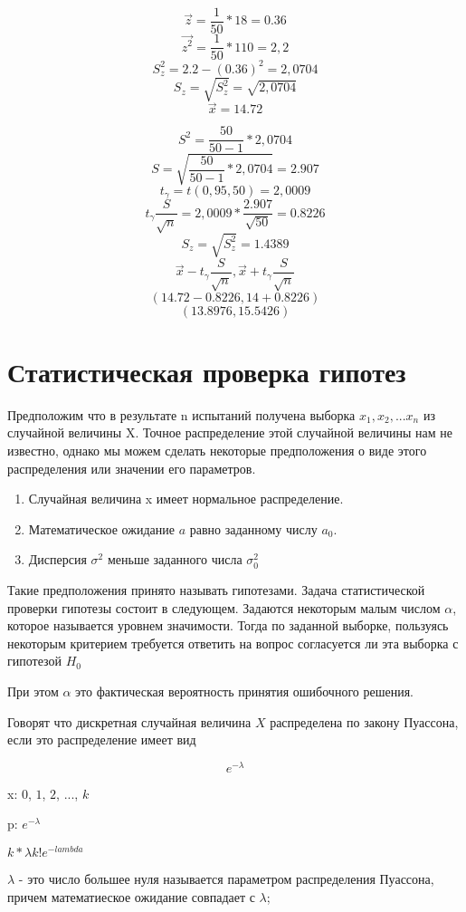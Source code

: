 \documentclass[a4paper]{article}
\begin{document}
$$ \vec{z} = \frac{1}{50} * 18 = 0.36$$
$$ \vec{z^2} = \frac{1}{50} * 110 = 2,2$$
$$ S_{z}^2 = 2.2 - (0.36)^2 = 2,0704 $$
$$ S_{z} = \sqrt{S_{z}^2} = \sqrt{2,0704} $$
$$ \vec{x} = 14.72$$

$$ S^2 = \frac{50}{50 - 1}*2,0704$$
$$ S = \sqrt{\frac{50}{50 - 1}*2,0704} = 2.907$$
$$ t_{\gamma} = t(0,95, 50) = 2,0009$$
$$ t_{\gamma} \frac{S}{\sqrt{n}} = 2,0009 * \frac{2.907}{\sqrt{50}} = 0.8226$$
$$ S_z = \sqrt{S_z^2} = 1.4389 $$
$$ \vec{x} - t_{\gamma}\frac{S}{\sqrt{n}}, \vec{x} + t_{\gamma}\frac{S}{\sqrt{n}}$$
$$ (14.72 - 0.8226, 14 + 0.8226)$$
$$ (13.8976, 15.5426)$$

\section{Статистическая проверка гипотез}

Предположим что в результате n испытаний получена выборка $x_1, x_2, ... x_n$ из случайной величины X. Точное распределение этой случайной величины нам не известно, однако мы можем сделать некоторые предположения о виде этого распределения или значении его параметров. 
\begin{enumerate}
    \item Случайная величина x имеет нормальное распределение.
    \item Математическое ожидание $a$ равно заданному числу $a_0$.
    \item Дисперсия $\sigma^2$ меньше заданного числа $\sigma_0^2$
\end{enumerate}

Такие предположения принято называть гипотезами. Задача статистической проверки гипотезы состоит в следующем.
Задаются некоторым малым числом $\alpha$, которое называется уровнем значимости. Тогда по заданной выборке, пользуясь некоторым критерием требуется ответить на вопрос согласуется ли эта выборка с гипотезой $H_0$

При этом $\alpha$ это фактическая вероятность принятия ошибочного решения.


Говорят что дискретная случайная величина $X$ распределена по закону Пуассона, если это распределение имеет вид

$$ e^{-\lambda} $$ 

x: $0$, $1$, $2$, ..., $k$

p: $e^{-\lambda}$ 

$ k * \lambda k! e^{-lambda} $

$\lambda$ - это число большее нуля называется параметром распределения Пуассона, причем математиеское ожидание совпадает с $\lambda$;
\end{document}
